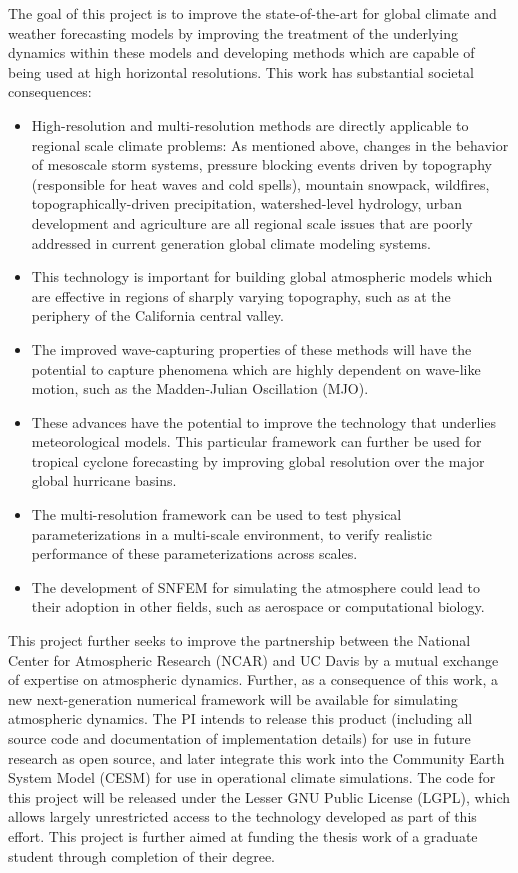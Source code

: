 \documentclass[11pt]{article}
\begin{document}
The goal of this project is to improve the state-of-the-art for global climate and weather forecasting models by improving the treatment of the underlying dynamics within these models and developing methods which are capable of being used at high horizontal resolutions.  This work has substantial societal consequences:
\vspace{-0.4cm}
\begin{itemize}
\item High-resolution and multi-resolution methods are directly applicable to regional scale climate problems: As mentioned above, changes in the behavior of mesoscale storm systems, pressure blocking events driven by topography (responsible for heat waves and cold spells), mountain snowpack, wildfires, topographically-driven precipitation, watershed-level hydrology, urban development and agriculture are all regional scale issues that are poorly addressed in current generation global climate modeling systems.
\item This technology is important for building global atmospheric models which are effective in regions of sharply varying topography, such as at the periphery of the California central valley.
\item The improved wave-capturing properties of these methods will have the potential to capture phenomena which are highly dependent on wave-like motion, such as the Madden-Julian Oscillation (MJO).
\item These advances have the potential to improve the technology that underlies meteorological models.  This particular framework can further be used for tropical cyclone forecasting by improving global resolution over the major global hurricane basins.
\item The multi-resolution framework can be used to test physical parameterizations in a multi-scale environment, to verify realistic performance of these parameterizations across scales.
\item The development of SNFEM for simulating the atmosphere could lead to their adoption in other fields, such as aerospace or computational biology.
\end{itemize}
\vspace{-0.4cm}
This project further seeks to improve the partnership between the National Center for Atmospheric Research (NCAR) and UC Davis by a mutual exchange of expertise on atmospheric dynamics.  Further, as a consequence of this work, a new next-generation numerical framework will be available for simulating atmospheric dynamics.  The PI intends to release this product (including all source code and documentation of implementation details) for use in future research as open source, and later integrate this work into the Community Earth System Model (CESM) \citep{JWHetal2013BAMS} for use in operational climate simulations.  The code for this project will be released under the Lesser GNU Public License (LGPL), which allows largely unrestricted access to the technology developed as part of this effort.  This project is further aimed at funding the thesis work of a graduate student through completion of their degree.
\end{document}
